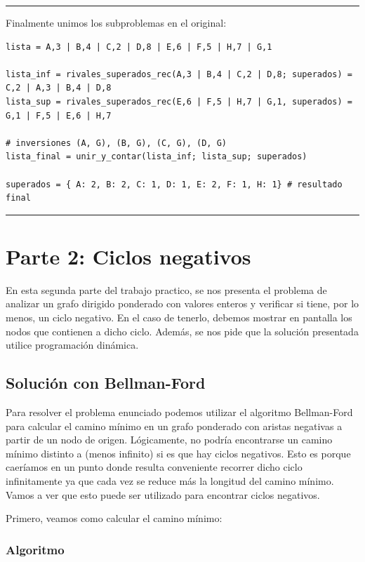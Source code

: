 \documentclass[titlepage,a4paper]{article}
\begin{document}
\noindent\rule{\textwidth}{0.5pt}

Finalmente unimos los subproblemas en el original:

\begin{verbatim}
lista = A,3 | B,4 | C,2 | D,8 | E,6 | F,5 | H,7 | G,1

lista_inf = rivales_superados_rec(A,3 | B,4 | C,2 | D,8; superados) = C,2 | A,3 | B,4 | D,8
lista_sup = rivales_superados_rec(E,6 | F,5 | H,7 | G,1, superados) = G,1 | F,5 | E,6 | H,7

# inversiones (A, G), (B, G), (C, G), (D, G)
lista_final = unir_y_contar(lista_inf; lista_sup; superados)

superados = { A: 2, B: 2, C: 1, D: 1, E: 2, F: 1, H: 1} # resultado final
\end{verbatim}

\noindent\rule{\textwidth}{0.5pt}

\newpage

\section{Parte 2: Ciclos negativos}
\label{sec:orgfc4290a}

En esta segunda parte del trabajo practico, se nos presenta el problema de
analizar un grafo dirigido ponderado con valores enteros y verificar si tiene,
por lo menos, un ciclo negativo. En el caso de tenerlo, debemos mostrar en
pantalla los nodos que contienen a dicho ciclo. Además, se nos pide que la
solución presentada utilice programación dinámica.

\subsection{Solución con Bellman-Ford}
\label{sec:org77b914c}
Para resolver el problema enunciado podemos utilizar el algoritmo Bellman-Ford
para calcular el camino mínimo en un grafo ponderado con aristas negativas a
partir de un nodo de origen. Lógicamente, no podría encontrarse un camino mínimo
distinto a (menos infinito) si es que hay ciclos negativos. Esto es porque
caeríamos en un punto donde resulta conveniente recorrer dicho ciclo
infinitamente ya que cada vez se reduce más la longitud del camino mínimo. Vamos
a ver que esto puede ser utilizado para encontrar ciclos negativos.


\hfill

Primero, veamos como calcular el camino mínimo:

\subsubsection{Algoritmo}
\label{sec:orge61f57c}
\end{document}
